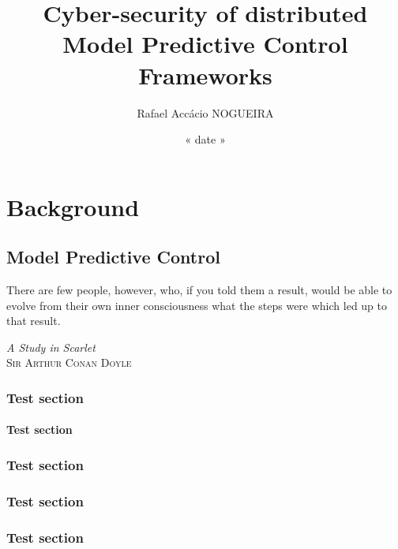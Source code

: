\documentclass{these-dbl}
\author{Rafael Accácio NOGUEIRA}
\title{Cyber-security of distributed Model Predictive Control Frameworks}
\date{« date »}
\begin{document}
\dominitoc

\maketitle
{}

\frontmatter
% 

\tableofcontents

% 

\listofacronyms
\listoffigures
\listoftables
\printglossary




\mainmatter

% 


\part{Background}
\minitoc
\chapter{Model Predictive Control}
\epigraph{\centering There are few people, however, who, if you told them a result, would be able to evolve from their own inner consciousness what the steps were which led up to that result.}
{\textit{A Study in Scarlet}\\ \textsc{Sir Arthur Conan Doyle}}
\minitoc

\section{Test section}

\subsection{Test section}
\section{Test section}
\section{Test section}
\section{Test section}
\end{document}

